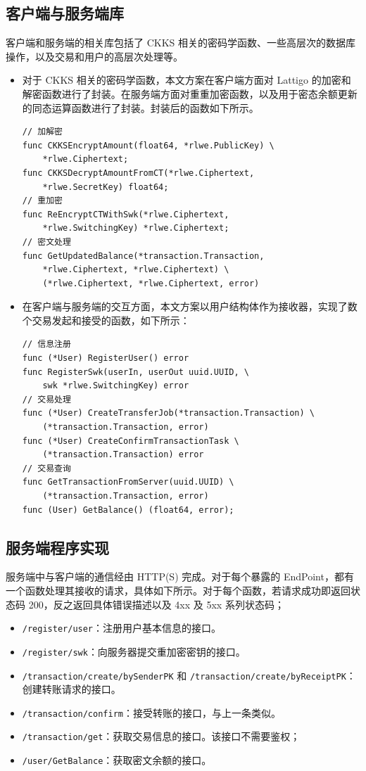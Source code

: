 \subsection{客户端与服务端库}

客户端和服务端的相关库包括了 CKKS 相关的密码学函数、一些高层次的数据库操作，以及交易和用户的高层次处理等。

\begin{itemize}
    \item 对于 CKKS 相关的密码学函数，本文方案在客户端方面对 Lattigo 的加密和解密函数进行了封装。在服务端方面对重重加密函数，以及用于密态余额更新的同态运算函数进行了封装。封装后的函数如下所示。
    \begin{verbatim}
// 加解密
func CKKSEncryptAmount(float64, *rlwe.PublicKey) \
    *rlwe.Ciphertext;
func CKKSDecryptAmountFromCT(*rlwe.Ciphertext, 
    *rlwe.SecretKey) float64;
// 重加密
func ReEncryptCTWithSwk(*rlwe.Ciphertext, 
    *rlwe.SwitchingKey) *rlwe.Ciphertext;
// 密文处理
func GetUpdatedBalance(*transaction.Transaction, 
    *rlwe.Ciphertext, *rlwe.Ciphertext) \
    (*rlwe.Ciphertext, *rlwe.Ciphertext, error)
    \end{verbatim}
    \item 在客户端与服务端的交互方面，本文方案以用户结构体作为接收器，实现了数个交易发起和接受的函数，如下所示：
    \begin{verbatim}
// 信息注册
func (*User) RegisterUser() error
func RegisterSwk(userIn, userOut uuid.UUID, \
    swk *rlwe.SwitchingKey) error
// 交易处理
func (*User) CreateTransferJob(*transaction.Transaction) \
    (*transaction.Transaction, error)
func (*User) CreateConfirmTransactionTask \
    (*transaction.Transaction) error
// 交易查询
func GetTransactionFromServer(uuid.UUID) \
    (*transaction.Transaction, error)
func (User) GetBalance() (float64, error);
    \end{verbatim}
\end{itemize}

\subsection{服务端程序实现}

服务端中与客户端的通信经由 HTTP(S) 完成。对于每个暴露的 EndPoint，都有一个函数处理其接收的请求，具体如下所示。对于每个函数，若请求成功即返回状态码 200，反之返回具体错误描述以及 4xx 及 5xx 系列状态码；

\begin{itemize}
    \item \verb|/register/user|：注册用户基本信息的接口。
    \item \verb|/register/swk|：向服务器提交重加密密钥的接口。
    \item \verb|/transaction/create/bySenderPK| 和 \verb|/transaction/create/byReceiptPK|：创建转账请求的接口。
    \item \verb|/transaction/confirm|：接受转账的接口，与上一条类似。
    \item \verb|/transaction/get|：获取交易信息的接口。该接口不需要鉴权；
    \item \verb|/user/GetBalance|：获取密文余额的接口。
\end{itemize}

